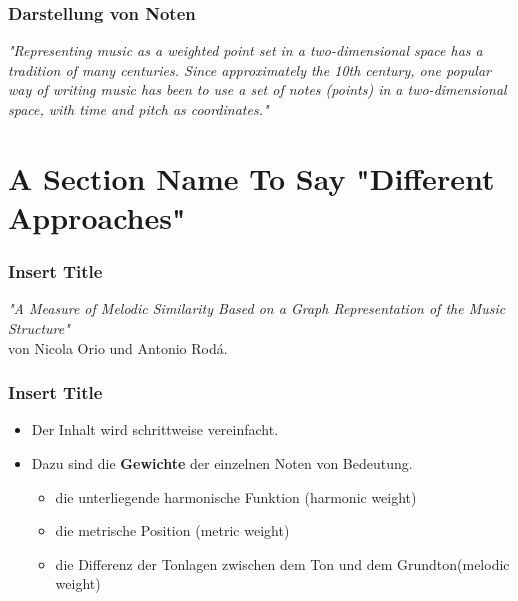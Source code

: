 \documentclass{beamer}
\begin{document}
	\begin{frame}
		\frametitle{Darstellung von Noten}
			\textit{"Representing music as a weighted point set in a two-dimensional space has a tradition of many centuries. Since approximately the 10th century, one popular way of writing music has been to use a set of notes (points) in a two-dimensional space, with time and pitch as coordinates."}\cite{three}
	\end{frame}

	\section{A Section Name To Say "Different Approaches"}

	\begin{frame}
		\frametitle{Insert Title }
		\begin{minipage}{0.45\textwidth}
			\begin{center}
				\textit{"A Measure of Melodic Similarity Based on a Graph Representation of the Music Structure"} 
				\cite{two_point_four}  \\ 
				von Nicola Orio und Antonio Rodá.
			\end{center}
		\end{minipage}%
		\begin{minipage}{0.45\textwidth}
			\begin{figure}[h!]
			\end{figure}
		\end{minipage}
	\end{frame}


	\begin{frame}
		\frametitle{Insert Title}
		\begin{itemize}
				\item Der Inhalt wird schrittweise vereinfacht.
				\item Dazu sind die \textbf{Gewichte} der einzelnen Noten von Bedeutung.
					\begin{itemize}
						\item die unterliegende harmonische Funktion (harmonic weight)
						\item die metrische Position (metric weight)
						\item die Differenz der Tonlagen zwischen dem Ton und dem Grundton(melodic weight)
					\end{itemize}
		\end{itemize}
	\end{frame}
\end{document}
